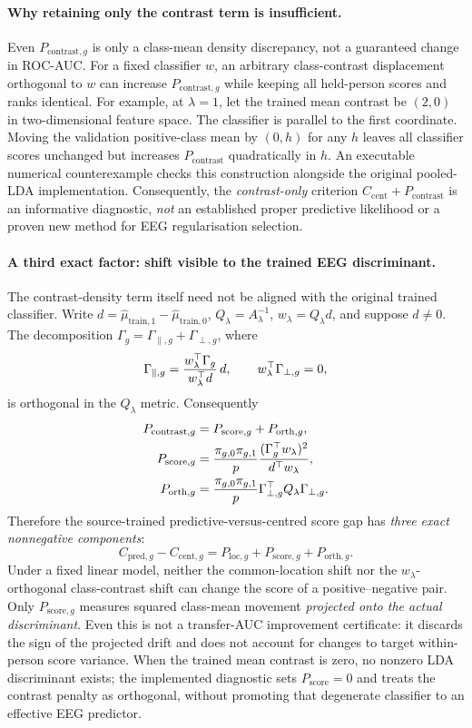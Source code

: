 \paragraph{Why retaining only the contrast term is insufficient.}
Even $P_{\mathrm{contrast},g}$ is only a class-mean
density discrepancy, not a guaranteed change in ROC-AUC.
For a fixed classifier $w$, an arbitrary class-contrast
displacement orthogonal to $w$ can increase
$P_{\mathrm{contrast},g}$ while keeping all
held-person scores and ranks identical.
For example, at $\lambda=1$, let the trained
mean contrast be $(2,0)$ in two-dimensional
feature space. The classifier is parallel to
the first coordinate. Moving the validation
positive-class mean by $(0,h)$ for any $h$ leaves
all classifier scores unchanged but increases
$P_{\mathrm{contrast}}$ quadratically in $h$.
An executable numerical counterexample checks
this construction alongside the original
pooled-LDA implementation. Consequently, the
\emph{contrast-only} criterion
$C_{\mathrm{cent}}+P_{\mathrm{contrast}}$
is an informative diagnostic, \emph{not} an
established proper predictive likelihood or a
proven new method for EEG regularisation selection.

\paragraph{A third exact factor: shift visible to the trained EEG discriminant.}
The contrast-density term itself need not be aligned
with the original trained classifier. Write
$d=\widehat\mu_{\mathrm{train},1}-
    \widehat\mu_{\mathrm{train},0}$,
$Q_\lambda=A_\lambda^{-1}$,
$w_\lambda=Q_\lambda d$, and suppose $d\ne0$.
The decomposition
$\Gamma_g=\Gamma_{\parallel,g}+\Gamma_{\perp,g}$,
where
\[
\Gamma_{\parallel,g}
 = {w_\lambda^\top\Gamma_g\over w_\lambda^\top d}\,d,
\qquad
w_\lambda^\top\Gamma_{\perp,g}=0,
\]
is orthogonal in the $Q_\lambda$ metric.
Consequently
\begin{align}
P_{\mathrm{contrast},g}
&=P_{\mathrm{score},g}+P_{\mathrm{orth},g},\\
P_{\mathrm{score},g}
&={\pi_{g,0}\pi_{g,1}\over p}
 {(\Gamma_g^\top w_\lambda)^2\over d^\top w_\lambda},\\
P_{\mathrm{orth},g}
&={\pi_{g,0}\pi_{g,1}\over p}
 \Gamma_{\perp,g}^\top Q_\lambda\Gamma_{\perp,g}.
\end{align}
Therefore the source-trained predictive-versus-centred
score gap has \emph{three exact nonnegative components}:
\[
 C_{\mathrm{pred},g}-C_{\mathrm{cent},g}
 =P_{\mathrm{loc},g}+P_{\mathrm{score},g}+P_{\mathrm{orth},g}.
\]
Under a fixed linear model, neither the common-location
shift nor the $w_\lambda$-orthogonal class-contrast shift
can change the score of a positive--negative pair.
Only $P_{\mathrm{score},g}$ measures squared class-mean
movement \emph{projected onto the actual discriminant}.
Even this is not a transfer-AUC improvement certificate:
it discards the sign of the projected drift and does not
account for changes to target within-person score variance.
When the trained mean contrast is zero, no nonzero
LDA discriminant exists; the implemented diagnostic
sets $P_{\mathrm{score}}=0$ and treats the contrast
penalty as orthogonal, without promoting that degenerate
classifier to an effective EEG predictor.

